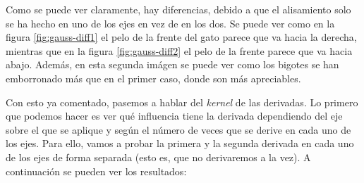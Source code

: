 \documentclass[11pt,a4paper]{article}
\begin{document}
Como se puede ver claramente, hay diferencias, debido a que el alisamiento solo se ha hecho en uno de los ejes en
vez de en los dos. Se puede ver como en la figura \ref{fig:gauss-diff1} el pelo de la frente del gato parece que
va hacia la derecha, mientras que en la figura \ref{fig:gauss-diff2} el pelo de la frente parece que va hacia abajo.
Además, en esta segunda imágen se puede ver como los bigotes se han emborronado más que en el primer caso, donde
son más apreciables.

Con esto ya comentado, pasemos a hablar del \textit{kernel} de las derivadas. Lo primero que podemos hacer es ver
qué influencia tiene la derivada dependiendo del eje sobre el que se aplique y según el número de veces que se derive
en cada uno de los ejes. Para ello, vamos a probar la primera y la segunda derivada en cada uno de los ejes de forma
separada (esto es, que no derivaremos a la vez). A continuación se pueden ver los resultados:
\end{document}
